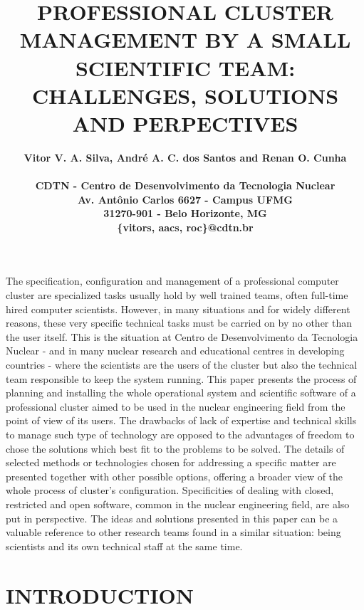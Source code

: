 \documentclass[twoside,a4paper,12pt,english]{inac17}
\title{PROFESSIONAL CLUSTER MANAGEMENT BY A SMALL SCIENTIFIC TEAM: CHALLENGES, SOLUTIONS
AND PERPECTIVES}
\author{
  \bf{Vitor V. A. Silva, Andr\'e A. C. dos Santos and Renan O. Cunha}\\ \\
  CDTN - Centro de Desenvolvimento da Tecnologia Nuclear\\
  Av. Ant\^onio Carlos 6627 - Campus UFMG\\
  31270-901 - Belo Horizonte, MG\\
  \{vitors, aacs, roc\}@cdtn.br}
\begin{document}
\maketitle

\pagestyle{myheadings}
\thispagestyle{empty}
\markboth{}{}


\thispagestyle{empty}


\begin{abstract_full_paper}
  The specification, configuration and management of a professional computer cluster are specialized
tasks usually hold by well trained teams, often full-time hired computer scientists. However, in
many situations and for widely different reasons, these very specific technical tasks must
be carried on by no other than the user itself. This is the situation at Centro de Desenvolvimento
da Tecnologia Nuclear - and in many nuclear research and educational centres in developing countries -
where the scientists are the users of the cluster but also the technical
team responsible to keep the system running. This paper presents the process of planning
and installing the whole operational system and scientific software of a professional cluster
aimed to be used in the nuclear engineering field from the point of view of its users.
The drawbacks of lack of expertise and technical skills to
manage such type of technology are opposed to the advantages of freedom to chose the solutions
which best fit to the problems to be solved. The details of selected methods or technologies
chosen for addressing a specific matter are presented together with other possible options, 
offering a broader view of the whole process of cluster's configuration. Specificities
of dealing with closed, restricted and open software, common in the nuclear engineering field,
are also put in perspective. The ideas and solutions presented in this paper can be a
valuable reference to other research teams found in a similar situation:
being scientists and its own technical staff at the same time.
\end{abstract_full_paper}


\section{INTRODUCTION}\label{int}
\end{document}
